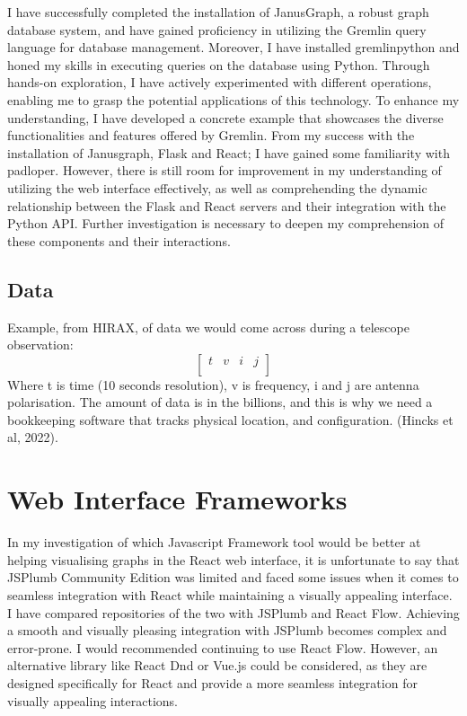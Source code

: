 \documentclass[apj]{emulateapj}
\begin{document}
I have successfully completed the installation of JanusGraph, a robust graph database system, and have gained proficiency in utilizing the Gremlin query language for database management. Moreover, I have installed gremlinpython and honed my skills in executing queries on the database using Python. Through hands-on exploration, I have actively experimented with different operations, enabling me to grasp the potential applications of this technology. To enhance my understanding, I have developed a concrete example that showcases the diverse functionalities and features offered by Gremlin. From my success with the installation of Janusgraph, Flask and React; I have gained some familiarity with padloper. However, there is still room for improvement in my understanding of utilizing the web interface effectively, as well as comprehending the dynamic relationship between the Flask and React servers and their integration with the Python API. Further investigation is necessary to deepen my comprehension of these components and their interactions.\\

\subsection{Data}
\label{sec:cmb_data}
Example, from HIRAX, of data we would come across during a telescope observation:
\begin{equation}  
\begin{bmatrix}
t & v & i & j\\
\end{bmatrix}
\label{eq:relativity}
\end{equation}
{Where t is time (10 seconds resolution), v is frequency, i and j are antenna polarisation}. The amount of data is in the billions, and this is why we need a bookkeeping software that tracks physical location, and configuration. (Hincks et al, 2022).

\section{Web Interface Frameworks}
\label{sec:data}
In my investigation of which Javascript Framework tool would be better at helping visualising graphs in the React web interface,  it is unfortunate to say that JSPlumb Community Edition was limited and faced some issues when it comes to seamless integration with React while maintaining a visually appealing interface. I have compared repositories of the two with JSPlumb and React Flow. Achieving a smooth and visually pleasing integration with JSPlumb becomes complex and error-prone. I would recommended continuing to use React Flow. However, an alternative library like React Dnd or Vue.js could be considered, as they are designed specifically for React and provide a more seamless integration for visually appealing interactions.
\end{document}
